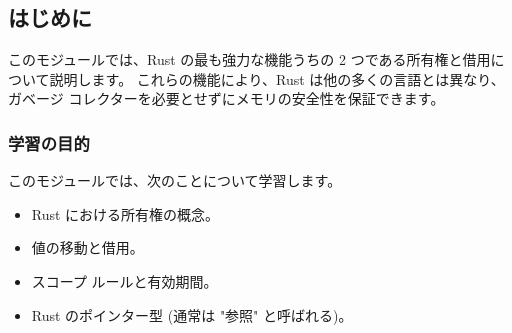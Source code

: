\subsection{はじめに}

このモジュールでは、Rust の最も強力な機能うちの 2 つである所有権と借用について説明します。 これらの機能により、Rust は他の多くの言語とは異なり、ガベージ コレクターを必要とせずにメモリの安全性を保証できます。

\subsubsection{学習の目的}

このモジュールでは、次のことについて学習します。

\begin{itemize}
\item Rust における所有権の概念。
\item 値の移動と借用。
\item スコープ ルールと有効期間。
\item Rust のポインター型 (通常は "参照" と呼ばれる)。
\end{itemize}